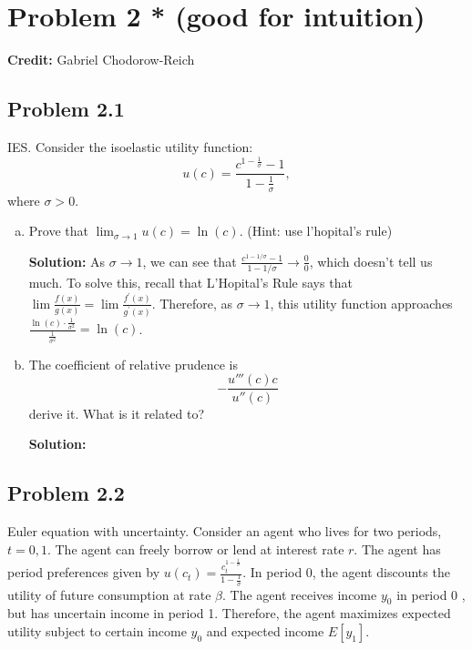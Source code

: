 \documentclass[11pt]{extarticle}
\theoremstyle{plain}
\theoremstyle{definition}
\begin{document}
\section*{Problem 2 * (good for intuition)}

\textbf{Credit:} Gabriel Chodorow-Reich

\vspace{5mm}
\noindent

\subsection*{ Problem 2.1}
 IES. Consider the isoelastic utility function:
$$
u(c)=\frac{c^{1-\frac{1}{\sigma}}-1}{1-\frac{1}{\sigma}},
$$
where $\sigma>0$.

\begin{enumerate}[(a)]
\item Prove that  $\lim _{\sigma \rightarrow 1} u(c)=\ln (c)$. (Hint: use l'hopital's rule) 


\textbf{Solution:} As $\sigma \rightarrow 1$, we can see that $\frac{c^{1-1 / \sigma}-1}{1-1 / \sigma} \rightarrow \frac{0}{0}$, which doesn't tell us much. To solve this, recall that L'Hopital's Rule says that $\lim \frac{f(x)}{g(x)}=\lim \frac{f^{\prime}(x)}{g^{\prime}(x)}$. Therefore, as $\sigma \rightarrow 1$, this utility function approaches $\frac{\ln (c) \cdot \frac{1}{\sigma^2}}{\frac{1}{\sigma^2}}=\ln (c)$.


\item The coefficient of relative prudence is $$-\frac{u'''(c)c}{u''(c)}$$ derive it. What is it related to?

\textbf{Solution:}

\end{enumerate}

\subsection*{Problem 2.2}

Euler equation with uncertainty. Consider an agent who lives for two periods, $t=0,1$. The agent can freely borrow or lend at interest rate $r$. The agent has period preferences given by $u\left(c_t\right)=\frac{c_t^{1-\frac{1}{\sigma}}}{1-\frac{1}{\sigma}}$. In period 0, the agent discounts the utility of future consumption at rate $\beta$. The agent receives income $y_0$ in period 0 , but has uncertain income in period 1. Therefore, the agent maximizes expected utility subject to certain income $y_0$ and expected income $E\left[y_1\right]$.
\end{document}
